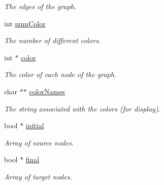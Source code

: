 \begin{DoxyCompactItemize}
\begin{DoxyCompactList}\small\item\em The edges of the graph. \end{DoxyCompactList}\item 
int \hyperlink{structGraph_a114923aa52539ee9fc588c7d8e767a5c}{num\+Color}\hypertarget{structGraph_a114923aa52539ee9fc588c7d8e767a5c}{}\label{structGraph_a114923aa52539ee9fc588c7d8e767a5c}

\begin{DoxyCompactList}\small\item\em The number of different colors. \end{DoxyCompactList}\item 
int $\ast$ \hyperlink{structGraph_ad348b81ecc5c36b613083cccb19df3b4}{color}\hypertarget{structGraph_ad348b81ecc5c36b613083cccb19df3b4}{}\label{structGraph_ad348b81ecc5c36b613083cccb19df3b4}

\begin{DoxyCompactList}\small\item\em The color of each node of the graph. \end{DoxyCompactList}\item 
char $\ast$$\ast$ \hyperlink{structGraph_a375c61879192f3a8a2f927d365c5fe79}{color\+Names}\hypertarget{structGraph_a375c61879192f3a8a2f927d365c5fe79}{}\label{structGraph_a375c61879192f3a8a2f927d365c5fe79}

\begin{DoxyCompactList}\small\item\em The string associated with the colors (for display). \end{DoxyCompactList}\item 
bool $\ast$ \hyperlink{structGraph_a45c2c819875204021587c1892fabfcab}{initial}\hypertarget{structGraph_a45c2c819875204021587c1892fabfcab}{}\label{structGraph_a45c2c819875204021587c1892fabfcab}

\begin{DoxyCompactList}\small\item\em Array of source nodes. \end{DoxyCompactList}\item 
bool $\ast$ \hyperlink{structGraph_af0a3dc44a442b2e20c20cdae02f8a52b}{final}\hypertarget{structGraph_af0a3dc44a442b2e20c20cdae02f8a52b}{}\label{structGraph_af0a3dc44a442b2e20c20cdae02f8a52b}

\begin{DoxyCompactList}\small\item\em Array of target nodes. \end{DoxyCompactList}\end{DoxyCompactItemize}


